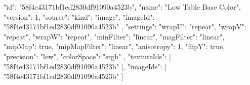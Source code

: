{
  "id": "58f4e43171bf1ed2830df91090a4523b",
  "name": "Low Table Base Color",
  "version": 1,
  "source": {
    "kind": "image",
    "imageId": "58f4e43171bf1ed2830df91090a4523b"
  },
  "settings": {
    "wrapU": "repeat",
    "wrapV": "repeat",
    "wrapW": "repeat",
    "minFilter": "linear",
    "magFilter": "linear",
    "mipMap": true,
    "mipMapFilter": "linear",
    "anisotropy": 1,
    "flipY": true,
    "precision": "low",
    "colorSpace": "srgb"
  },
  "textureIds": [
    "58f4e43171bf1ed2830df91090a4523b"
  ],
  "imageIds": [
    "58f4e43171bf1ed2830df91090a4523b"
  ]
}

